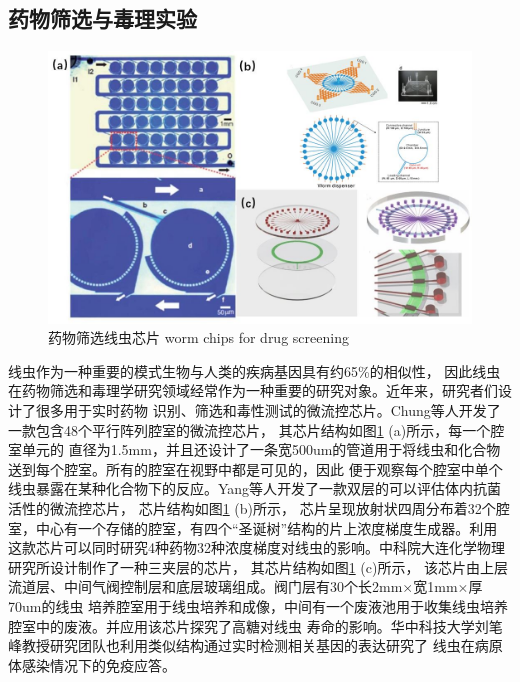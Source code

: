 \subsection{药物筛选与毒理实验}
\label{sec:intro:analog}
	\begin{figure}[b]
	  \centering
	  \includegraphics[width=12cm]{figure/chap1/screen.jpg}
	  \bicaption
		{药物筛选线虫芯片}
		{worm chips for drug screening}
	  \label{fig:screening}
	\end{figure}
	线虫作为一种重要的模式生物与人类的疾病基因具有约65\%的相似性\cite{Baumeister2002The,Sonnhammer1997Analysis}，
	因此线虫在药物筛选和毒理学研究领域经常作为一种重要的研究对象。近年来，研究者们设计了很多用于实时药物
	识别、筛选和毒性测试的微流控芯片。Chung等人\cite{Chung2011Microfluidic}开发了一款包含48个平行阵列腔室的微流控芯片，
	其芯片结构如图\ref{fig:screening} (a)所示，每一个腔室单元的
	直径为1.5mm，并且还设计了一条宽500um的管道用于将线虫和化合物送到每个腔室。所有的腔室在视野中都是可见的，因此
	便于观察每个腔室中单个线虫暴露在某种化合物下的反应。Yang等人\cite{Yang2013An}开发了一款双层的可以评估体内抗菌活性的微流控芯片，
	芯片结构如图\ref{fig:screening} (b)所示，
	芯片呈现放射状四周分布着32个腔室，中心有一个存储的腔室，有四个“圣诞树”结构的片上浓度梯度生成器\cite{Dertinger2001Generation,Jeon2000Generation}。利用
	这款芯片可以同时研究4种药物32种浓度梯度对线虫的影响。中科院大连化学物理研究所设计制作了一种三夹层的芯片，
	其芯片结构如图\ref{fig:screening} (c)所示，
	该芯片由上层流道层、中间气阀控制层和底层玻璃组成。阀门层有30个长2mm$\times$宽1mm$\times$厚70um的线虫
	培养腔室用于线虫培养和成像，中间有一个废液池用于收集线虫培养腔室中的废液。并应用该芯片探究了高糖对线虫
	寿命的影响\cite{zhuliguo2016}。华中科技大学刘笔峰教授研究团队也利用类似结构通过实时检测相关基因的表达研究了
	线虫在病原体感染情况下的免疫应答\cite{hu2018real}。

